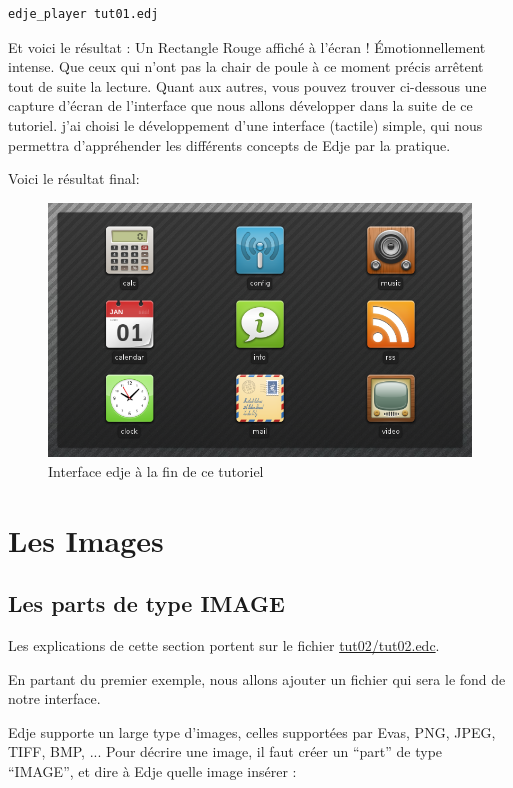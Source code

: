 \documentclass[a4paper]{efr}
\begin{document}
\begin{lstlisting}
edje_player tut01.edj
\end{lstlisting}

Et voici le résultat : Un Rectangle Rouge affiché à l'écran ! Émotionnellement
intense.
Que ceux qui n'ont pas la chair de poule à ce moment précis arrêtent tout de
suite la lecture. Quant aux autres, vous pouvez trouver ci-dessous une capture
d'écran de l'interface que nous allons développer dans la suite de ce tutoriel.
j'ai choisi le développement d'une interface (tactile) simple, qui nous
permettra d'appréhender les différents concepts de Edje par la pratique.

Voici le résultat final:
\begin{figure}[htb]
  \begin{center}
    \includegraphics[scale=0.5]{images/screenshot1.png}
  \end{center}
  \caption{Interface edje à la fin de ce tutoriel}
\end{figure}

\section{Les Images}
\subsection{Les parts de type IMAGE}
Les explications de cette section portent sur le fichier
\href{file://tut02/tut02.edc}{tut02/tut02.edc}.

En partant du premier exemple, nous allons ajouter un fichier qui sera le fond
de notre interface.

Edje supporte un large type d'images, celles supportées par Evas,
PNG, JPEG, TIFF, BMP, ...
Pour décrire une image, il faut créer un ``part'' de type ``IMAGE'',
et dire à Edje quelle image insérer :
\end{document}

